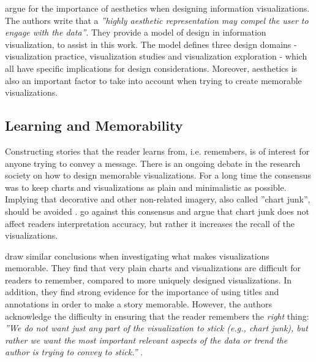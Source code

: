 \documentclass[a4paper,11pt,oldfontcommands]{packages/kth-mag}
\begin{document}
\citet{moere2011role} argue for the importance of aesthetics when designing information visualizations. The authors write that a \emph{''highly aesthetic representation may compel the user to engage with the data''}. They provide a model of design in information visualization, to assist in this work. The model defines three design domains - visualization practice, visualization studies and visualization exploration - which all have specific implications for design considerations. Moreover, aesthetics is also an important factor to take into account when trying to create memorable visualizations.

\subsection{Learning and Memorability}
Constructing stories that the reader learns from, i.e. remembers, is of interest for anyone trying to convey a message. There is an ongoing debate in the research society on how to design memorable visualizations. For a long time the consensus was to keep charts and visualizations as plain and minimalistic as possible. Implying that decorative and other non-related imagery, also called ''chart junk'', should be avoided \cite{tufte1983visual}. \citet{bateman2010useful} go against this consensus and argue that chart junk does not affect readers interpretation accuracy, but rather it increases the recall of the visualizations. 

\citet{borkin2013makes,borkin2016beyond} draw similar conclusions when investigating what makes visualizations memorable. They find that very plain charts and visualizations are difficult for readers to remember, compared to more uniquely designed visualizations. In addition, they find strong evidence for the importance of using titles and annotations in order to make a story memorable. However, the authors acknowledge the difficulty in ensuring that the reader remembers the \emph{right} thing: \emph{''We do not want just any part of the visualization to stick (e.g., chart junk), but rather we want the most important relevant aspects of the data or trend the author is trying to convey to stick.''} \cite{borkin2013makes}.
\end{document}
